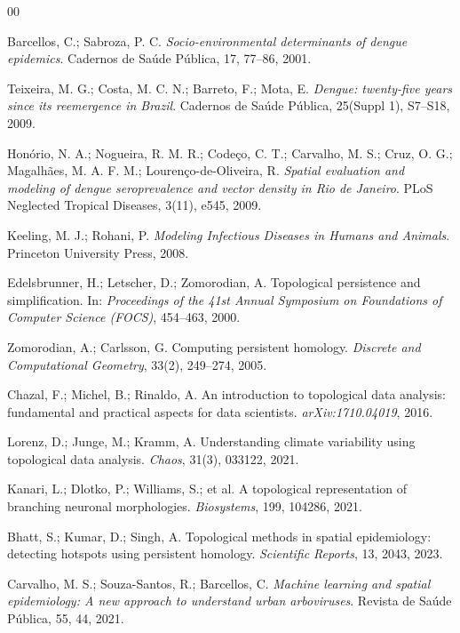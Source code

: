 \documentclass[final,3p,times,twocolumn]{elsarticle}
\begin{document}
\nocite{*}
\begin{thebibliography}{00}

Barcellos, C.; Sabroza, P. C.
\textit{Socio-environmental determinants of dengue epidemics}.
Cadernos de Saúde Pública, 17, 77--86, 2001.

Teixeira, M. G.; Costa, M. C. N.; Barreto, F.; Mota, E.
\textit{Dengue: twenty-five years since its reemergence in Brazil}.
Cadernos de Saúde Pública, 25(Suppl 1), S7--S18, 2009.

Honório, N. A.; Nogueira, R. M. R.; Codeço, C. T.; Carvalho, M. S.; Cruz, O. G.; 
Magalhães, M. A. F. M.; Lourenço-de-Oliveira, R.
\textit{Spatial evaluation and modeling of dengue seroprevalence and vector density in Rio de Janeiro}.
PLoS Neglected Tropical Diseases, 3(11), e545, 2009.

Keeling, M. J.; Rohani, P.
\textit{Modeling Infectious Diseases in Humans and Animals}.
Princeton University Press, 2008.

Edelsbrunner, H.; Letscher, D.; Zomorodian, A.
Topological persistence and simplification.
In: \textit{Proceedings of the 41st Annual Symposium on Foundations of Computer Science (FOCS)}, 454--463, 2000.

Zomorodian, A.; Carlsson, G.
Computing persistent homology.
\textit{Discrete and Computational Geometry}, 33(2), 249--274, 2005.

Chazal, F.; Michel, B.; Rinaldo, A.
An introduction to topological data analysis: fundamental and practical aspects for data scientists.
\textit{arXiv:1710.04019}, 2016.

Lorenz, D.; Junge, M.; Kramm, A.
Understanding climate variability using topological data analysis.
\textit{Chaos}, 31(3), 033122, 2021.

Kanari, L.; Dlotko, P.; Williams, S.; et al.
A topological representation of branching neuronal morphologies.
\textit{Biosystems}, 199, 104286, 2021.

Bhatt, S.; Kumar, D.; Singh, A.
Topological methods in spatial epidemiology: detecting hotspots using persistent homology.
\textit{Scientific Reports}, 13, 2043, 2023.

Carvalho, M. S.; Souza-Santos, R.; Barcellos, C.
\textit{Machine learning and spatial epidemiology: A new approach to understand urban arboviruses}.
Revista de Saúde Pública, 55, 44, 2021.


\end{thebibliography}
\end{document}
